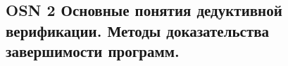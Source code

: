\subsection{OSN 2 Основные понятия дедуктивной верификации. Методы доказательства завершимости программ.}
